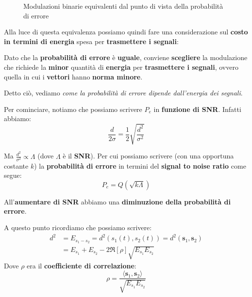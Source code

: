 \begin{figure}[!ht]
    \caption{Modulazioni binarie equivalenti dal punto di vista della probabilità di errore}
    \label{fig:08_17_ModulazioniBinarieEquivalenti}
\end{figure}

Alla luce di questa equivalenza possiamo quindi fare una considerazione sul 
\textbf{costo in termini di energia} spesa per \textbf{trasmettere i segnali}:

\begin{remark}
    Dato che la \textbf{probabilità di errore} è \textbf{uguale},
    conviene \textbf{scegliere} la modulazione che richiede la \textbf{minor} 
    quantità di \textbf{energia} per \textbf{trasmettere i segnali}, ovvero quella
    in cui i \textbf{vettori} hanno \textbf{norma minore}.
\end{remark}

Detto ciò, vediamo \textit{come la probabilità di errore dipende dall'energia dei segnali}.

Per cominciare, notiamo che possiamo scrivere $P_e$ in \textbf{funzione di SNR}. 
Infatti abbiamo:
\[
    \frac{d}{2 \sigma} = \frac{1}{2} \sqrt{ \frac{d^2}{\sigma^2}} 
\]

Ma $\frac{d^2}{\sigma^2} \propto \Lambda$ (dove $\Lambda$ è il \textbf{SNR}).
Per cui possiamo scrivere (con una opportuna costante $k$) la 
\textbf{probabilità di errore} in termini del \textbf{signal to noise ratio}
come segue:
\[
    P_e = Q(\sqrt{k \Lambda })
\]

\begin{remark}
    All'\textbf{aumentare di SNR} abbiamo una \textbf{diminuzione della probabilità di errore}.
\end{remark}

A questo punto ricordiamo che possiamo scrivere:
\[
    \begin{aligned}
        d^2 &= E_{s_{1}-s_{2}} = d^2(s_{1}(t), s_{2}(t)) = d^2(\mathbf{s}_1, \mathbf{s}_2) \\ 
            &= E_{s_{1}} + E_{s_{2}} -2 \Re[\rho ] \sqrt{E_{s_{1}} E_{s_{2}}}  
    \end{aligned}
\]
Dove $\rho$ era il \textbf{coefficiente di correlazione}:
\[
    \rho = \frac{\langle \mathbf{s}_1, \mathbf{s}_2 \rangle}{\sqrt{E_{s_{1}} E_{s_{2}}}}
\]


